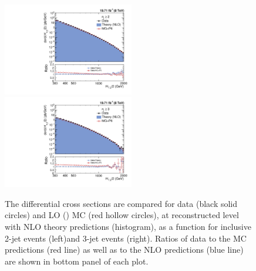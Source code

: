 \begin{figure}[!htbp]
 \begin{center}
 \includegraphics[width=0.51\textwidth]{Plots_HT_2_150/Comparison_all_2_HT_2_150.pdf}%
 ~~\includegraphics[width=0.51\textwidth]{Plots_HT_2_150/Comparison_all_3_HT_2_150.pdf}\\
 \caption{The differential cross sections are compared for data (black solid circles) and LO \MadGraphF \plus \PYTHIAS (\MGP) MC (red hollow circles), at reconstructed level with NLO theory predictions (histogram), as a function \httwo for inclusive 2-jet events (left)and 3-jet events (right). Ratios of data to the MC predictions (red line) as well as to the NLO predictions (blue line) are shown in bottom panel of each plot.}
 \label{fig:comp_all}
 \end{center}
\end{figure}

